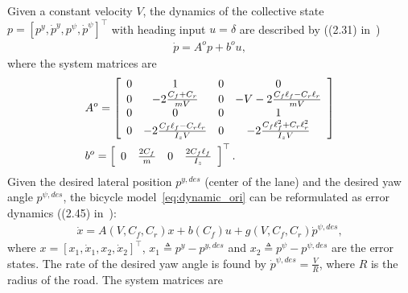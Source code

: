 \documentclass[letterpaper, 10 pt, conference]{ieeeconf}
\begin{document}
Given a constant velocity $V$, the dynamics of the collective state $p = [p^y, \dot{p}^y, p^\psi, \dot{p}^\psi]^\top$ with heading input $u = \delta$ are described by ((2.31) in~\cite{rajamani2011vehicle})
\begin{align}
    \dot{p} = A^o p + b^o u,
    \label{eq:dynamic_ori}
\end{align}
where the system matrices are
\begin{align*}
    &A^o=\left[
    \begin{array}{cccc}
        0& 1& 0& 0\\
        0& -2\frac{C_f+C_r}{m V}& 0& -V - 2\frac{C_f\ell_f-C_r\ell_r}{m V}\\
        0& 0& 0& 1\\
        0& -2\frac{C_f\ell_f-C_r\ell_r}{I_z V}&0& -2\frac{C_f\ell_f^2+C_r\ell_r^2}{I_z V}
    \end{array}
    \right]\nonumber\\
    &b^o =\left[
    \begin{array}{cccc}
        0&
        \frac{2C_f}{m}&
        0&
        \frac{2 C_f\ell_f}{I_z}\\
    \end{array}
    \right]^\top.
\end{align*}
Given the desired lateral position $p^{y,des}$ (center of the lane) and the desired yaw angle $p^{\psi,des}$, the bicycle model~\eqref{eq:dynamic_ori} can be reformulated as error dynamics ((2.45) in~\cite{rajamani2011vehicle}):
\begin{align}
    \dot{x} = A(V,C_f,C_r) x + b(C_f) u + g(V,C_f,C_r) \dot{p}^{\psi,des}, %
    \label{eq:dynamic}
\end{align}
where $x = [x_1,\dot{x}_1, x_2,\dot{x}_2]^\top$, $x_1 \triangleq p^y - p^{y,des}$ and $x_2 \triangleq p^\psi - p^{\psi,des}$ are the error states.
The rate of the desired yaw angle is found by $\dot{p}^{\psi,des} = \frac{V}{R}$, where $R$ is the radius of the road.
The system matrices are
\end{document}
